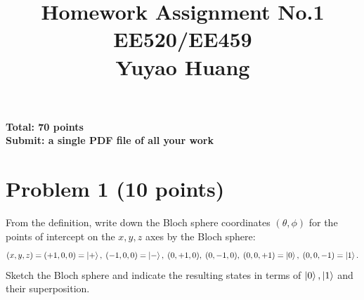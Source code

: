 \documentclass[11pt]{article}
\title{Homework Assignment No.1 \\ EE520/EE459 \\ Yuyao Huang}
\date{}
\begin{document}
\maketitle

\textbf{Total: 70 points} \\
\textbf{Submit: a single PDF file of all your work}

\section*{Problem 1 (10 points)}
From the definition, write down the Bloch sphere coordinates $(\theta,\phi)$ for the points of intercept on the $x,y,z$ axes by the Bloch sphere:
\[
(x,y,z)=(+1,0,0)=\ket{+},\;
(-1,0,0)=\ket{-},\;
(0,+1,0),\;
(0,-1,0),\;
(0,0,+1)=\ket{0},\;
(0,0,-1)=\ket{1}.
\]
Sketch the Bloch sphere and indicate the resulting states in terms of $\ket{0}, \ket{1}$ and their superposition.
\end{document}
